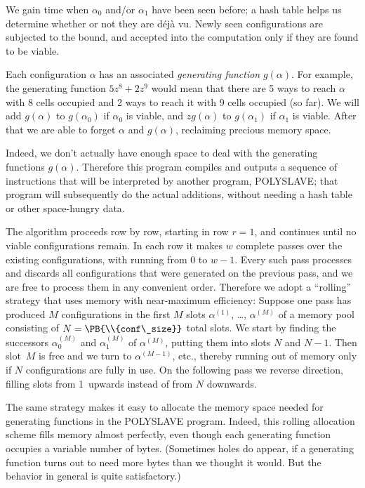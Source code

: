 We gain time when $\alpha_0$ and/or $\alpha_1$ have been seen before;
a hash table helps us determine whether or not they are d\'ej\`a vu.
Newly seen configurations are subjected to the  bound, and
accepted into the computation only if they are found to be viable.

Each configuration $\alpha$ has an associated {\it generating function\/}
$g(\alpha)$. For example, the generating function $5z^8+2z^9$ would mean that
there are 5 ways to reach $\alpha$ with 8 cells occupied and 2 ways to reach
it with 9 cells occupied (so far). We will add $g(\alpha)$ to $g(\alpha_0)$ if
$\alpha_0$ is viable, and $zg(\alpha)$ to $g(\alpha_1)$ if $\alpha_1$ is
viable. After that we are able to forget $\alpha$ and $g(\alpha)$,
reclaiming precious memory space.

Indeed, we don't actually have enough space to deal with the generating
functions $g(\alpha)$. Therefore this program compiles and outputs a sequence
of instructions that will be interpreted by another program, {\mc POLYSLAVE};
that program will subsequently do the actual additions, without needing a hash
table or other space-hungry data.

The algorithm proceeds row by row, starting in row $r=1$, and continues until
no viable configurations remain. In each row it makes $w$ complete passes
over the existing configurations, with  running from 0 to
$w-1$.
Every such pass processes and discards all configurations that were generated
on the previous pass, and we are free to process them in any convenient
order. Therefore we adopt a ``rolling'' strategy that uses memory with
near-maximum efficiency: Suppose one pass has produced $M$ configurations
in the first $M$ slots $\alpha^{(1)}$, \dots, $\alpha^{(M)}$ of a memory pool
consisting of $N=\PB{\\{conf\_size}}$ total slots. We start by finding the
successors $\alpha^{(M)}_0$ and $\alpha^{(M)}_1$ of $\alpha^{(M)}$, putting
them into slots $N$ and $N-1$. Then slot~$M$ is free and we turn to
$\alpha^{(M-1)}$, etc., thereby running out of memory only if $N$
configurations are fully in use. On the following pass we reverse direction,
filling slots from 1~upwards instead of from $N$ downwards.

The same strategy makes it easy to allocate the memory space needed for
generating functions in the {\mc POLYSLAVE} program. Indeed, this rolling
allocation scheme fills memory almost perfectly, even though each generating
function occupies a variable number of bytes. (Sometimes holes do appear,
if a generating function turns out to need more bytes than we thought it
would. But the behavior in general is quite satisfactory.)

